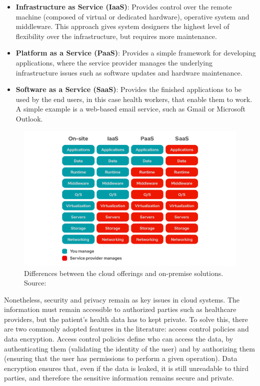 \begin{itemize}
    \item \textbf{Infrastructure as Service (IaaS)}: Provides control over the remote machine (composed of virtual or dedicated hardware), operative system and middleware. This approach gives system designers the highest level of flexibility over the infrastructure, but requires more maintenance.
    \item \textbf{Platform as a Service (PaaS)}: Provides a simple framework for developing applications, where the service provider manages the underlying infrastructure issues such as software updates and hardware maintenance. 
    \item \textbf{Software as a Service (SaaS)}: Provides the finished applications to be used by the end users, in this case health workers, that enable them to work. A simple example is a web-based email service, such as Gmail or Microsoft Outlook. 
\end{itemize}

\begin{figure}[H]
    \centering
    \includegraphics[width=\linewidth]{images/cloud-services.png}
    \caption[Differences between the cloud offerings and on-premise solutions.]{ Differences between the cloud offerings and on-premise solutions. Source: \cite{RedHat2021}}
    \label{fig:differences-between-cloud-services}
\end{figure}

Nonetheless, security and privacy remain as key issues in cloud systems. The information must remain accessible to authorized parties such as healthcare providers, but the patient's health data has to kept private. To solve this, there are two commonly adopted features in the literature:  access control policies and data encryption. Access control policies define who can access the data, by authenticating them (validating the identity of the user) and by authorizing them (ensuring that the user has permissions to perform a given operation). Data encryption ensures that, even if the data is leaked, it is still unreadable to third parties, and therefore the sensitive information remains secure and private.


